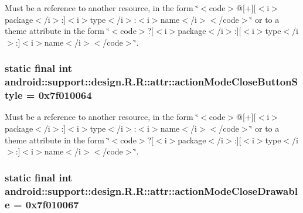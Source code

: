 Must be a reference to another resource, in the form \char`\"{}$<$code$>$@\mbox{[}+\mbox{]}\mbox{[}$<$i$>$package$<$/i$>$:\mbox{]}$<$i$>$type$<$/i$>$:$<$i$>$name$<$/i$>$$<$/code$>$\char`\"{} or to a theme attribute in the form \char`\"{}$<$code$>$?\mbox{[}$<$i$>$package$<$/i$>$:\mbox{]}\mbox{[}$<$i$>$type$<$/i$>$:\mbox{]}$<$i$>$name$<$/i$>$$<$/code$>$\char`\"{}. \hypertarget{classandroid_1_1support_1_1design_1_1_r_1_1attr_6c1f328c149c87abb4c61356aefef155}{
\subsubsection[{actionModeCloseButtonStyle}]{\setlength{\rightskip}{0pt plus 5cm}static final int android::support::design.R.R::attr::actionModeCloseButtonStyle = 0x7f010064}}
\label{classandroid_1_1support_1_1design_1_1_r_1_1attr_6c1f328c149c87abb4c61356aefef155}


Must be a reference to another resource, in the form \char`\"{}$<$code$>$@\mbox{[}+\mbox{]}\mbox{[}$<$i$>$package$<$/i$>$:\mbox{]}$<$i$>$type$<$/i$>$:$<$i$>$name$<$/i$>$$<$/code$>$\char`\"{} or to a theme attribute in the form \char`\"{}$<$code$>$?\mbox{[}$<$i$>$package$<$/i$>$:\mbox{]}\mbox{[}$<$i$>$type$<$/i$>$:\mbox{]}$<$i$>$name$<$/i$>$$<$/code$>$\char`\"{}. \hypertarget{classandroid_1_1support_1_1design_1_1_r_1_1attr_dac79f3d39681744782abe083cae89b3}{
\subsubsection[{actionModeCloseDrawable}]{\setlength{\rightskip}{0pt plus 5cm}static final int android::support::design.R.R::attr::actionModeCloseDrawable = 0x7f010067}}
\label{classandroid_1_1support_1_1design_1_1_r_1_1attr_dac79f3d39681744782abe083cae89b3}


